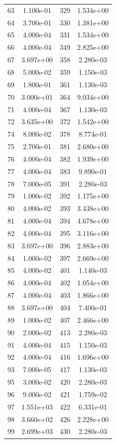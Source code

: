 \documentclass[12pt]{article}
\begin{document}
\begin{longtable}{@{}cccc@{}}
63 & 1.100e-01 & 329 & 1.534e+00 \\
64 & 3.700e-01 & 330 & 1.381e+00 \\
65 & 4.000e-04 & 331 & 1.534e+00 \\
66 & 4.000e-04 & 349 & 2.825e+00 \\
67 & 3.697e+00 & 358 & 2.280e-03 \\
68 & 5.000e-02 & 359 & 1.150e-03 \\
69 & 1.800e-01 & 361 & 1.130e-03 \\
70 & 3.000e+01 & 364 & 9.034e+00 \\
71 & 4.000e-04 & 367 & 1.130e-03 \\
72 & 3.635e+00 & 372 & 1.542e+00 \\
74 & 8.000e-02 & 378 & 8.774e-01 \\
75 & 2.700e-01 & 381 & 2.680e+00 \\
76 & 4.000e-04 & 382 & 1.939e+00 \\
77 & 4.000e-04 & 383 & 9.890e-01 \\
78 & 7.000e-05 & 391 & 2.280e-03 \\
79 & 1.000e-02 & 392 & 1.175e+00 \\
80 & 4.000e-02 & 393 & 3.438e+00 \\
81 & 4.000e-04 & 394 & 4.678e+00 \\
82 & 4.000e-04 & 395 & 3.116e+00 \\
83 & 3.697e+00 & 396 & 2.883e+00 \\
84 & 1.000e-02 & 397 & 2.669e+00 \\
85 & 4.000e-02 & 401 & 1.140e-03 \\
86 & 4.000e-04 & 402 & 1.054e+00 \\
87 & 4.000e-04 & 403 & 1.866e+00 \\
88 & 3.697e+00 & 404 & 7.400e-01 \\
89 & 1.000e-02 & 407 & 2.466e+00 \\
90 & 2.000e-02 & 413 & 2.280e-03 \\
91 & 4.000e-04 & 415 & 1.150e-03 \\
92 & 4.000e-04 & 416 & 1.696e+00 \\
93 & 7.000e-05 & 417 & 1.130e-03 \\
95 & 3.000e-02 & 420 & 2.280e-03 \\
96 & 9.000e-02 & 421 & 1.759e-02 \\
97 & 1.551e+03 & 422 & 6.331e-01 \\
98 & 3.660e+02 & 426 & 2.228e+00 \\
99 & 2.699e+03 & 430 & 2.280e-03 \\

\end{longtable}
\end{document}
